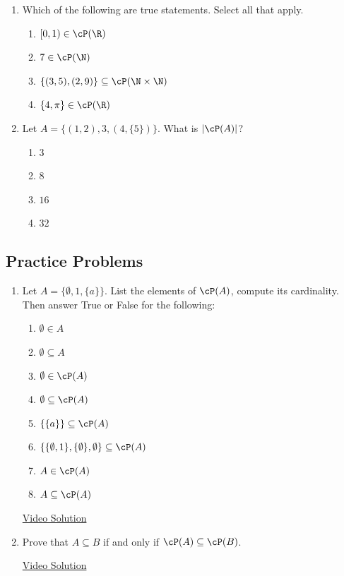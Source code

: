 \begin{enumerate}
    \item Which of the following are true statements. Select all that apply.
    \begin{enumerate}
        \item $[0,1) \in \cP(\R)$
        \item $7 \in \cP(\N)$
        \item $\{(3,5),(2,9)\} \subseteq \cP(\N \times \N)$
        \item $\{4, \pi\} \in \cP(\R)$
    \end{enumerate}
    
    \item Let $A = \{(1,2), 3, (4,\{5\})\}$. What is $|\cP(A)|$?
    \begin{enumerate}
        \item $3$
        \item $8$
        \item $16$
        \item $32$
    \end{enumerate}
\end{enumerate}

\subsection*{Practice Problems}

\begin{enumerate}\renewcommand{\labelenumi}{\thesubsection.\theenumi}
\item Let $A = \{\emptyset, 1, \{a\}\}$. List the elements of $\cP(A)$, compute its cardinality. Then answer True or False for the following:
\begin{enumerate}
    \item $\emptyset \in A$
    \item $\emptyset \subseteq A$
    \item $\emptyset \in \cP(A)$
    \item $\emptyset \subseteq \cP(A)$
    \item $\{\{a\}\} \subseteq \cP(A)$
    \item $\{\{\emptyset, 1\}, \{\emptyset\}, \emptyset\} \subseteq \cP(A)$
    \item $A \in \cP(A)$
    \item $A \subseteq \cP(A)$
\end{enumerate}

\href{https://youtu.be/Pprf24H6SLc}{Video Solution}

\item Prove that $A \subseteq B$ if and only if $\cP(A) \subseteq \cP(B)$. 

\href{https://youtu.be/24tLpM3qdMM}{Video Solution}
\end{enumerate}


